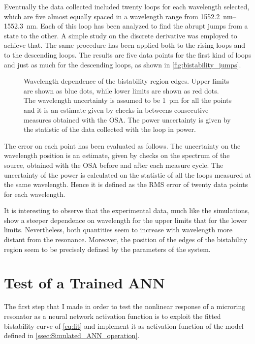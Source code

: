 Eventually the data collected included twenty loops for each wavelength selected, which are five almost equally spaced in a wavelength range from \SIrange{1552.2}{1552.3}{\nm}.
Each of this loop has been analyzed to find the abrupt jumps from a state to the other.
A simple study on the discrete derivative was employed to achieve that.
The same procedure has been applied both to the rising loops and to the descending loops.
The results are five data points for the first kind of loops and just as much for the descending loops, as shown in \autoref{fig:bistability_jumps}.

\begin{figure}[!hbtp]
	\centering
	
	\caption{Wavelength dependence of the bistability region edges.
		Upper limits are shown as blue dots, while lower limits are shown as red dots.
		The wavelength uncertainty is assumed to be \SI{1}{\pm} for all the points and it is an estimate given by checks in betweens consecutive measures obtained with the OSA.
		The power uncertainty is given by the statistic of the data collected with the loop in power.
	}
	\label{fig:bistability_jumps}
\end{figure}

The error on each point has been evaluated as follows.
The uncertainty on the wavelength position is an estimate, given by checks on the spectrum of the source, obtained with the OSA before and after each measure cycle.
The uncertainty of the power is calculated on the statistic of all the loops measured at the same wavelength.
Hence it is defined as the RMS error of twenty data points for each wavelength.

It is interesting to observe that the experimental data, much like the simulations, show a steeper dependence on wavelength for the upper limits that for the lower limits.
Nevertheless, both quantities seem to increase with wavelength more distant from the resonance.
Moreover, the position of the edges of the bistability region seem to be precisely defined by the parameters of the system.

\section{Test of a Trained ANN}
\label{sec:Test_of_a_Trained ANN}
The first step that I made in order to test the nonlinear response of a microring resonator as a neural network activation function is to exploit the fitted bistability curve of \autoref{eq:fit} and implement it as activation function of the model defined in \autoref{ssec:Simulated_ANN_operation}.

